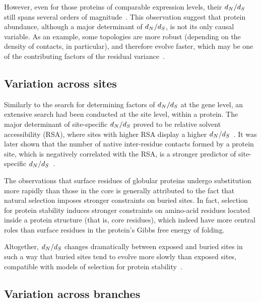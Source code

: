 However, even for those proteins of comparable expression levels, their $d_N / d_S$ still spans several orders of magnitude~\citep{Drummond2008}.
This observation suggest that protein abundance, although a major determinant of $d_N / d_S$, is not its only causal variable.
As an example, some topologies are more robust (depending on the density of contacts, in particular), and therefore evolve faster, which may be one of the contributing factors of the residual variance~\citep{Echave2017}.

\subsection{Variation across sites}
\label{subsec:thermo-variation-across-sites}

Similarly to the search for determining factors of $d_N / d_S$ at the gene level, an extensive search had been conducted at the site level, within a protein.
The major determinant of site-specific $d_N / d_S$ proved to be relative solvent accessibility (RSA), where sites with higher RSA display a higher $d_N / d_S$~\citep{Ramsey2011}.
It was later shown that the number of native inter-residue contacts formed by a protein site, which is negatively correlated with the RSA, is a stronger predictor of site-specific $d_N / d_S$~\citep{Yeh2013}.

The observations that surface residues of globular proteins undergo \gls{substitution} more rapidly than those in the core is generally attributed to the fact that natural selection imposes stronger constraints on buried sites.
In fact, selection for protein stability induces stronger constraints on amino-acid residues located inside a protein structure (that is, core residues), which indeed have more central roles than surface residues in the protein's Gibbs free energy of folding.

Altogether, $d_N / d_S$ changes dramatically between exposed and buried sites in such a way that buried sites tend to evolve more slowly than exposed sites, compatible with models of selection for protein stability~\citep{Echave2016}.

\subsection{Variation across branches}
\label{subsec:thermo-variation-across-branches}

